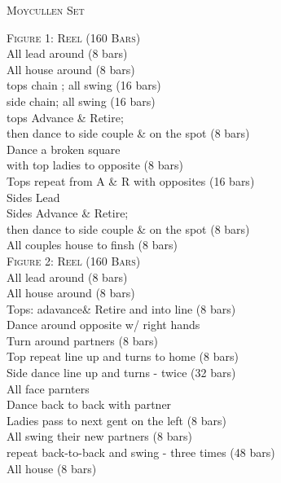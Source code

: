 \begin{center}
\textsc{Moycullen Set} \\
\end{center}


\small \textsc{Figure 1: Reel (160 Bars)}\\


\bodyText
All lead around (8 bars)\\
All house around (8 bars)\\
tops chain ; all swing (16 bars)\\
side chain; all swing (16 bars)\\
tops Advance \& Retire; \\
then dance to side couple \& on the spot (8 bars)\\
Dance a broken square\\
with top ladies to opposite  (8 bars)\\
Tops repeat from A \& R with opposites (16 bars)\\
Sides Lead \\
Sides Advance \& Retire; \\
then dance to side couple \& on the spot (8 bars)\\
All couples house to finsh (8 bars)\\

\small \textsc{Figure 2: Reel (160 Bars)}\\

\bodyText
All lead around (8 bars)\\
All house around (8 bars)\\
Tops: adavance\& Retire and into line (8 bars)\\
Dance around opposite w/ right hands\\
Turn around partners (8 bars)\\
Top repeat line up and turns to home (8 bars)\\
Side dance line up and turns - twice  (32 bars)\\
All face parnters\\
Dance back to back with partner\\
Ladies pass to next gent on the left (8 bars)\\
All swing their new partners (8 bars)\\
repeat back-to-back and swing - three times  (48 bars)\\
All house (8 bars)
